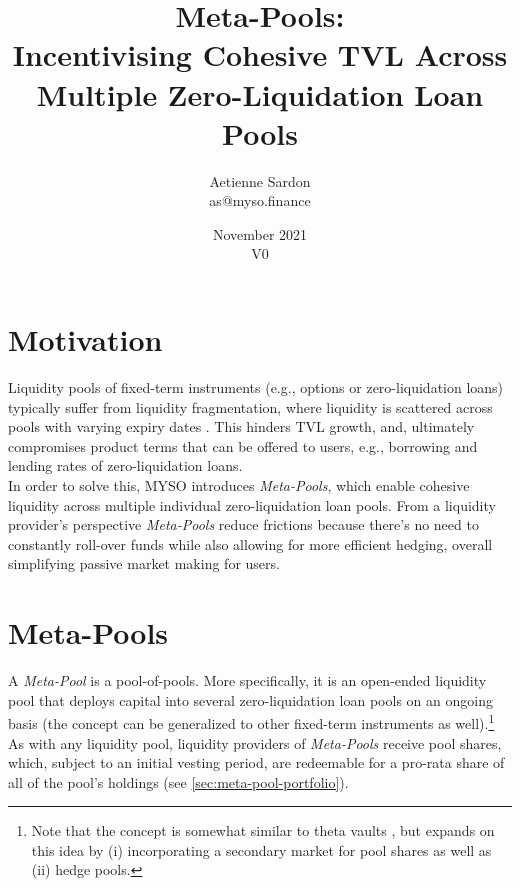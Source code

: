 \documentclass[a4paper]{article}
\title{Meta-Pools:\\ Incentivising Cohesive TVL Across Multiple Zero-Liquidation Loan Pools}%
\author{Aetienne Sardon\\\small{as@myso.finance}}
\date{November 2021\\\small{V0}}
\begin{document}
\maketitle




\section{Motivation}
Liquidity pools of fixed-term instruments (e.g., options or zero-liquidation loans) typically suffer from liquidity fragmentation, where liquidity is scattered across pools with varying expiry dates \cite{everlasting_options}. This hinders TVL growth, and, ultimately compromises product terms that can be offered to users, e.g., borrowing and lending rates of zero-liquidation loans.\\

In order to solve this, MYSO introduces \emph{Meta-Pools}, which enable cohesive liquidity across multiple individual zero-liquidation loan pools. From a liquidity provider's perspective \emph{Meta-Pools} reduce frictions because there's no need to constantly roll-over funds while also allowing for more efficient hedging, overall simplifying passive market making for users. %

\section{Meta-Pools}
\label{sec:meta-pools}
A \emph{Meta-Pool} is a pool-of-pools. More specifically, it is an open-ended liquidity pool that deploys capital into several zero-liquidation loan pools on an ongoing basis (the concept can be generalized to other fixed-term instruments as well).\footnote{Note that the concept is somewhat similar to theta vaults \cite{ribbon}, but expands on this idea by (i) incorporating a secondary market for pool shares as well as (ii) hedge pools.} %
As with any liquidity pool, liquidity providers of \emph{Meta-Pools} receive pool shares, which, subject to an initial vesting period, are redeemable for a pro-rata share of all of the pool's holdings (see \cref{sec:meta-pool-portfolio}).\\
\end{document}
